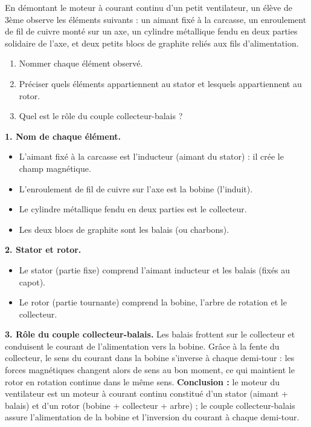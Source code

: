 \documentclass[11pt]{article}
\newcommand{\cle}[1]{{\popxbold\color{popdark}#1}}
\begin{document}
\begin{exoresolu}
En démontant le moteur à courant continu d'un petit ventilateur, un élève de 3ème observe les éléments suivants : un aimant fixé à la carcasse, un enroulement de fil de cuivre monté sur un axe, un cylindre métallique fendu en deux parties solidaire de l'axe, et deux petits blocs de graphite reliés aux fils d'alimentation.
\begin{enumerate}
\item Nommer chaque élément observé.
\item Préciser quels éléments appartiennent au stator et lesquels appartiennent au rotor.
\item Quel est le rôle du couple collecteur-balais ?
\end{enumerate}
\tcblower
\textbf{1. Nom de chaque élément.}
\begin{itemize}
\item L'aimant fixé à la carcasse est l'\cle{inducteur} (aimant du stator) : il crée le champ magnétique.
\item L'enroulement de fil de cuivre sur l'axe est la \cle{bobine} (l'induit).
\item Le cylindre métallique fendu en deux parties est le \cle{collecteur}.
\item Les deux blocs de graphite sont les \cle{balais} (ou charbons).
\end{itemize}
\textbf{2. Stator et rotor.}
\begin{itemize}
\item Le \cle{stator} (partie fixe) comprend l'aimant inducteur et les balais (fixés au capot).
\item Le \cle{rotor} (partie tournante) comprend la bobine, l'arbre de rotation et le collecteur.
\end{itemize}
\textbf{3. Rôle du couple collecteur-balais.} Les balais frottent sur le collecteur et conduisent le courant de l'alimentation vers la bobine. Grâce à la fente du collecteur, le sens du courant dans la bobine s'inverse à chaque demi-tour : les forces magnétiques changent alors de sens au bon moment, ce qui maintient le rotor en rotation continue dans le même sens.
\textbf{Conclusion :} le moteur du ventilateur est un moteur à courant continu constitué d'un stator (aimant + balais) et d'un rotor (bobine + collecteur + arbre) ; le couple collecteur-balais assure l'alimentation de la bobine et l'inversion du courant à chaque demi-tour.
\end{exoresolu}
\end{document}
